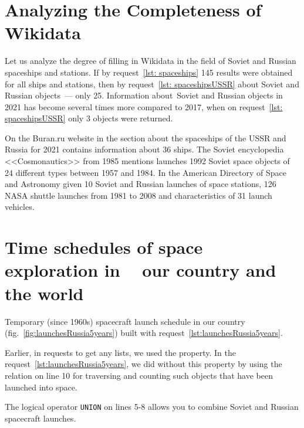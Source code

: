 \section{Analyzing the Completeness of Wikidata}

Let us analyze the degree of filling in Wikidata in the field of Soviet and Russian spaceships and stations.
If by request~\ref{lst: spaceships} 145 results were obtained for all ships and stations,
then by request~\ref{lst: spaceshipsUSSR} about Soviet and Russian objects~--- only 25.
Information about~Soviet and Russian objects in 2021
has become several times more compared to 2017,
when on request~\ref{lst: spaceshipsUSSR} only 3 objects were returned.

On the Buran.ru website in the section about the spaceships of the USSR and Russia for 2021
contains information about 36\autocite{spacecraftBuran} ships.
The Soviet encyclopedia <<Cosmonautics>> from 1985 mentions launches
1992 Soviet space objects of 24 different types
between 1957 and 1984.\autocite[498]{spacecraftCosmonavtika}
In the American Directory of Space and Astronomy
given 10 Soviet and Russian launches of space stations\autocite[296]{spacecraftSAA},
126 NASA shuttle launches from 1981 to 2008\autocite[288]{spacecraftSAA}
and characteristics of 31 launch vehicles\autocite[290-291]{spacecraftSAA}.

\label{question:spacecraft_1}

\section{Time schedules of space exploration in ~ our country and the world}

Temporary (since 1960s)
spacecraft launch schedule in our country (fig.~\ref{fig:launchesRussia5years})
built with request~\ref{lst:launchesRussia5years}.%

Earlier, in requests to get any lists, we used the property.
In the request~\ref{lst:launchesRussia5years}, we did without this property by using the relation
 on line 10
for traversing and counting such objects that have been launched into space.

The logical operator \lstinline|UNION| on lines 5-8
allows you to combine Soviet and Russian spacecraft launches.

